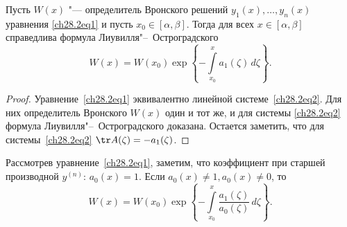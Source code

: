 \begin{thm}
Пусть $W(x)$ "--- определитель Вронского решений $y_1(x), \ldots, y_n(x)$ уравнения \eqref{ch28.2eq1} и пусть $x_0 \in [\alpha, \beta]$. Тогда для всех $x \in [\alpha, \beta]$ справедлива формула Лиувилля"--~Остроградского
$$
W(x) = W(x_0) \exp \left\lbrace - \int\limits_{x_0}^{x} a_1(\zeta) \,d\zeta \right\rbrace.
$$
\end{thm}

\begin{proof}
Уравнение~\eqref{ch28.2eq1} эквивалентно линейной системе~\eqref{ch28.2eq2}. Для них определитель Вронского $W(x)$ один и тот же, и для системы \eqref{ch28.2eq2} формула Лиувилля"--~Остроградского доказана. Остается заметить, что для системы~\eqref{ch28.2eq2} $\tr A(\zeta) = - a_1(\zeta)$.
\end{proof}

\begin{notion}
Рассмотрев уравнение~\eqref{ch28.2eq1}, заметим, что коэффициент при старшей производной $y^{(n)}$:  $a_0(x) = 1$. Если $a_0(x) \not= 1, a_0(x) \not= 0$, то 
$$
W(x) = W(x_0) \exp \left\lbrace - \int\limits_{x_0}^{x} \frac{a_1(\zeta)}{a_0(\zeta)} \,d\zeta \right\rbrace.
$$
\end{notion}

